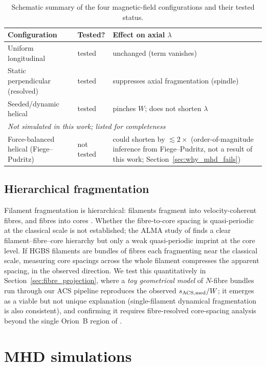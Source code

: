 \documentclass[usenatbib,twoside,twocolumn]{mnras}
\begin{document}
\begin{table}
\caption{Schematic summary of the four magnetic-field configurations and their tested status.}
\label{tab:magcases}
\footnotesize
\setlength{\tabcolsep}{4pt}
\begin{tabular}{@{}p{2.9cm}lp{3.0cm}@{}}
\toprule
Configuration & Tested? & Effect on axial $\lambda$ \\
\midrule
Uniform longitudinal & tested & unchanged (term vanishes) \\
Static perpendicular (resolved) & tested & suppresses axial fragmentation (spindle) \\
Seeded/dynamic helical & tested & pinches $W$; does not shorten $\lambda$ \\
\midrule
\multicolumn{3}{l}{\emph{Not simulated in this work; listed for completeness}}\\
Force-balanced helical (Fiege--Pudritz) & not tested & could shorten by $\lesssim2\times$ (order-of-magnitude inference from Fiege--Pudritz, not a result of this work; Section~\ref{sec:why_mhd_fails}) \\
\bottomrule
\end{tabular}
\end{table}

\subsection{Hierarchical fragmentation}

Filament fragmentation is hierarchical: filaments fragment into velocity-coherent fibres, and fibres into cores \citep{Hacar2013,Hacar2018,Yang2024}. Whether the fibre-to-core spacing is quasi-periodic at the classical scale is not established; the ALMA study of \citet{Yang2024} finds a clear filament--fibre--core hierarchy but only a weak quasi-periodic imprint at the core level. If HGBS filaments are bundles of fibres each fragmenting near the classical scale, measuring core spacings across the whole filament compresses the apparent spacing, in the observed direction. We test this quantitatively in Section~\ref{sec:fibre_projection}, where a \emph{toy geometrical model} of $N$-fibre bundles run through our ACS pipeline reproduces the observed $s_{\rm ACS,med}/W$; it emerges as a viable but not unique explanation (single-filament dynamical fragmentation is also consistent), and confirming it requires fibre-resolved core-spacing analysis beyond the single Orion~B region of \citet{Yang2024}.

\section{MHD simulations}
\label{sec:sims}
\end{document}
